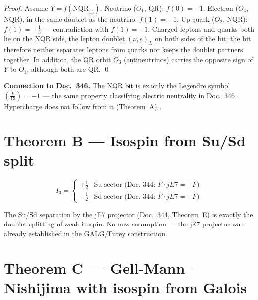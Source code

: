 \begin{proof}
Assume $Y=f(\mathrm{NQR}_{13})$.
Neutrino ($O_1$, QR): $f(0)=-1$.
Electron ($O_4$, NQR), in the same doublet as the neutrino: $f(1)=-1$.
Up quark ($O_2$, NQR): $f(1)=+\tfrac{1}{3}$ --- contradiction with $f(1)=-1$.
Charged leptons and quarks both lie on the NQR side, the lepton doublet $(\nu,e)_L$
on both sides of the bit; the bit therefore neither separates leptons from quarks nor
keeps the doublet partners together. In addition, the QR orbit $O_3$ (antineutrinos)
carries the opposite sign of $Y$ to $O_1$, although both are QR. \qed
\end{proof}

\textbf{Connection to Doc.~346.} The NQR bit is exactly the Legendre symbol
$\left(\tfrac{k}{13}\right)=-1$ --- the same property classifying electric
neutrality in Doc.~346 \BM. Hypercharge does not follow from it (Theorem~A) \SM.

\section{Theorem B --- Isospin from Su/Sd split}

\begin{theorem}
\[
  I_3 = \begin{cases}
    +\tfrac{1}{2} & \text{Su sector (Doc.~344: }F\cdot jE7=+F\text{)}\\
    -\tfrac{1}{2} & \text{Sd sector (Doc.~344: }F\cdot jE7=-F\text{)}
  \end{cases}
\]
\end{theorem}

The Su/Sd separation by the jE7 projector (Doc.~344, Theorem~E) is exactly the
doublet splitting of weak isospin. No new assumption --- the jE7 projector was
already established in the GALG/Furey construction.

\section{Theorem C --- Gell-Mann--Nishijima with isospin from Galois}

